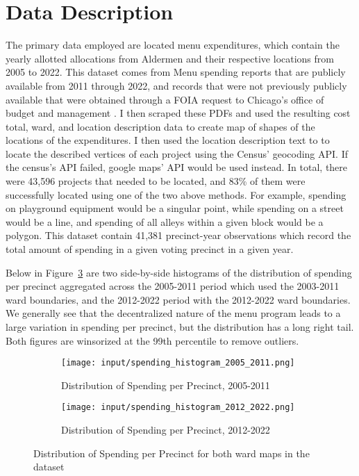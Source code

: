 \section*{Data Description}
The primary data employed are located menu expenditures, which contain the yearly allotted allocations from Aldermen and their respective locations from 2005 to 2022.
This dataset comes from Menu spending reports that are publicly available from 2011 through 2022, and records that were not previously publicly available that were obtained through a FOIA request to Chicago's office of budget and management \cite{OBM_datasource}.  
I then scraped these PDFs and used the resulting cost total, ward, and location description data to create map of shapes of the locations of the expenditures.
I then used the location description text to to locate the described vertices of each project using the Census' geocoding API. 
If the census's API failed, google maps' API would be used instead.
In total, there were 43,596 projects that needed to be located, and 83\% of them were successfully located using one of the two above methods.
For example, spending on playground equipment would be a singular point, while spending on a street would be a line, and spending of all alleys within a given block would be a polygon.
This dataset contain 41,381 precinct-year observations which record the total amount of spending in a given voting precinct in a given year.

Below in Figure~\ref*{fig:spending_hist} are two side-by-side histograms of the distribution of spending per precinct aggregated across the 2005-2011 period which used the 2003-2011 ward boundaries, and the 2012-2022 period with the 2012-2022 ward boundaries.
We generally see that the decentralized nature of the menu program leads to a large variation in spending per precinct, but the distribution has a long right tail.
Both figures are winsorized at the 99th percentile to remove outliers.

\begin{figure}[H]
    \centering
    \begin{subfigure}[b]{0.45\textwidth} %
      \texttt{[image: input/spending\_histogram\_2005\_2011.png]}
      \caption{Distribution of Spending per Precinct, 2005-2011}
      \label{fig:sub1}
    \end{subfigure}
    \hfill %
    \begin{subfigure}[b]{0.45\textwidth}
      \texttt{[image: input/spending\_histogram\_2012\_2022.png]}
      \caption{Distribution of Spending per Precinct, 2012-2022}
      \label{fig:sub2}
    \end{subfigure}
  
    \caption{Distribution of Spending per Precinct for both ward maps in the dataset}
    \label{fig:spending_hist}
  \end{figure}


